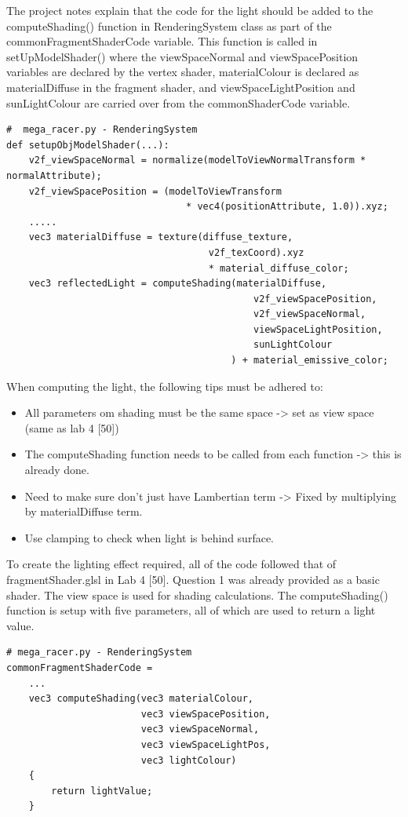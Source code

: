 \documentclass[a4 paper, 12pt]{article}
\begin{document}
The project notes explain that the code for the light should be added to the computeShading() function in RenderingSystem class as part of the commonFragmentShaderCode variable. This function is called in setUpModelShader() where the viewSpaceNormal and viewSpacePosition variables are declared by the vertex shader, materialColour is declared as materialDiffuse in the fragment shader, and viewSpaceLightPosition and sunLightColour are carried over from the commonShaderCode variable. 
    \begin{lstlisting}
#  mega_racer.py - RenderingSystem
def setupObjModelShader(...):
    v2f_viewSpaceNormal = normalize(modelToViewNormalTransform * normalAttribute);
    v2f_viewSpacePosition = (modelToViewTransform 
                                * vec4(positionAttribute, 1.0)).xyz;
    .....
    vec3 materialDiffuse = texture(diffuse_texture, 
                                    v2f_texCoord).xyz 
                                    * material_diffuse_color;
    vec3 reflectedLight = computeShading(materialDiffuse, 
                                            v2f_viewSpacePosition, 
                                            v2f_viewSpaceNormal, 
                                            viewSpaceLightPosition, 
                                            sunLightColour
                                        ) + material_emissive_color;
    \end{lstlisting}

When computing the light, the following tips must be adhered to:
    \begin{itemize}     
        \item All parameters om shading must be the same space -> set as view space (same as lab 4 [50])         
        \item The computeShading function needs to be called from each function -> this is already done.
        \item Need to make sure don't just have Lambertian term -> Fixed by multiplying by materialDiffuse term.
        \item Use clamping to check when light is behind surface.
    \end{itemize}

To create the lighting effect required, all of the code followed that of fragmentShader.glsl in Lab 4 [50]. Question 1 was already provided as a basic shader. The view space is used for shading calculations. The computeShading() function is setup with five parameters, all of which are used to return a light value.
    \begin{lstlisting}
# mega_racer.py - RenderingSystem
commonFragmentShaderCode =
    ...
    vec3 computeShading(vec3 materialColour, 
                        vec3 viewSpacePosition, 
                        vec3 viewSpaceNormal, 
                        vec3 viewSpaceLightPos, 
                        vec3 lightColour)
    {
        return lightValue;
    }
    \end{lstlisting}
\end{document}
